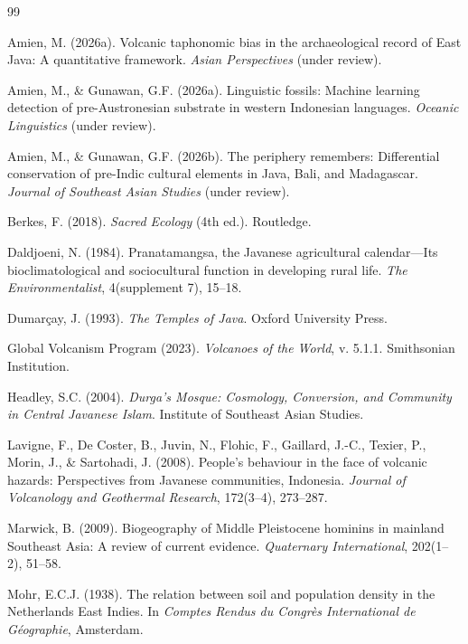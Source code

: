 \documentclass[12pt,a4paper]{article}
\begin{document}
\begin{thebibliography}{99}

Amien, M. (2026a). Volcanic taphonomic bias in the archaeological record of East Java: A quantitative framework. \emph{Asian Perspectives} (under review).

Amien, M., \& Gunawan, G.F. (2026a). Linguistic fossils: Machine learning detection of pre-Austronesian substrate in western Indonesian languages. \emph{Oceanic Linguistics} (under review).

Amien, M., \& Gunawan, G.F. (2026b). The periphery remembers: Differential conservation of pre-Indic cultural elements in Java, Bali, and Madagascar. \emph{Journal of Southeast Asian Studies} (under review).

Berkes, F. (2018). \emph{Sacred Ecology} (4th ed.). Routledge.

Daldjoeni, N. (1984). Pranatamangsa, the Javanese agricultural calendar---Its bioclimatological and sociocultural function in developing rural life. \emph{The Environmentalist}, 4(supplement 7), 15--18.

Dumarçay, J. (1993). \emph{The Temples of Java}. Oxford University Press.

Global Volcanism Program (2023). \emph{Volcanoes of the World}, v. 5.1.1. Smithsonian Institution.

Headley, S.C. (2004). \emph{Durga's Mosque: Cosmology, Conversion, and Community in Central Javanese Islam}. Institute of Southeast Asian Studies.

Lavigne, F., De Coster, B., Juvin, N., Flohic, F., Gaillard, J.-C., Texier, P., Morin, J., \& Sartohadi, J. (2008). People's behaviour in the face of volcanic hazards: Perspectives from Javanese communities, Indonesia. \emph{Journal of Volcanology and Geothermal Research}, 172(3--4), 273--287.

Marwick, B. (2009). Biogeography of Middle Pleistocene hominins in mainland Southeast Asia: A review of current evidence. \emph{Quaternary International}, 202(1--2), 51--58.

Mohr, E.C.J. (1938). The relation between soil and population density in the Netherlands East Indies. In \emph{Comptes Rendus du Congr\`{e}s International de G\'{e}ographie}, Amsterdam.


\end{thebibliography}
\end{document}
